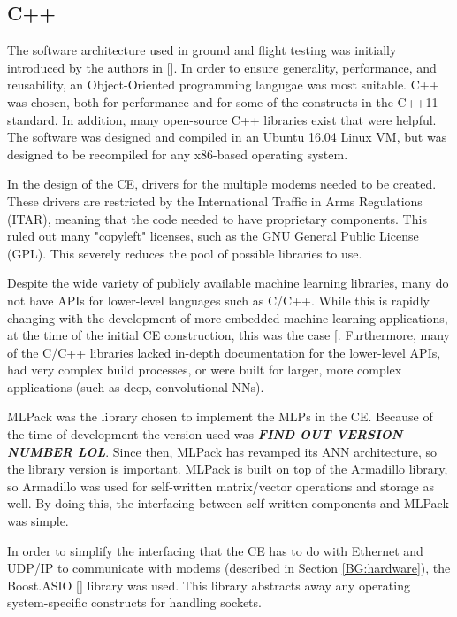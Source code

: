 \subsection{C++}
\par The software architecture used in ground and flight testing was initially introduced by the authors in [\cite{lol cite it}]. In order to ensure generality, performance, and reusability, an Object-Oriented programming langugae was most suitable. C++ was chosen, both for performance and for some of the constructs in the C++11 standard. In addition, many open-source C++ libraries exist that were helpful. The software was designed and compiled in an Ubuntu 16.04 Linux VM, but was designed to be recompiled for any x86-based operating system.
\par In the design of the CE, drivers for the multiple modems needed to be created. These drivers are restricted by the International Traffic in Arms Regulations (ITAR), meaning that the code needed to have proprietary components. This ruled out many "copyleft" licenses, such as the GNU General Public License (GPL). This severely reduces the pool of possible libraries to use. 
\par Despite the wide variety of publicly available machine learning libraries, many do not have APIs for lower-level languages such as C/C++. While this is rapidly changing with the development of more embedded machine learning applications, at the time of the initial CE construction, this was the case [\cite{lol tim paper}. Furthermore, many of the C/C++ libraries lacked in-depth documentation for the lower-level APIs, had very complex build processes, or were built for larger, more complex applications (such as deep, convolutional NNs). 
\par MLPack \cite{cite_MLPAck_lol} was the library chosen to implement the MLPs in the CE. Because of the time of development the version used was \textbf{\textit{FIND OUT VERSION NUMBER LOL}}. Since then, MLPack has revamped its ANN architecture, so the library version is important. MLPack is built on top of the Armadillo \cite{cite_armadillo_lol} library, so Armadillo was used for self-written matrix/vector operations and storage as well. By doing this, the interfacing between self-written components and MLPack was simple. 
\par In order to simplify the interfacing that the CE has to do with Ethernet and UDP/IP to communicate with modems (described in Section \ref{BG:hardware}), the Boost.ASIO [\cite{cite_boostasio_lol}] library was used. This library abstracts away any operating system-specific constructs for handling sockets.
